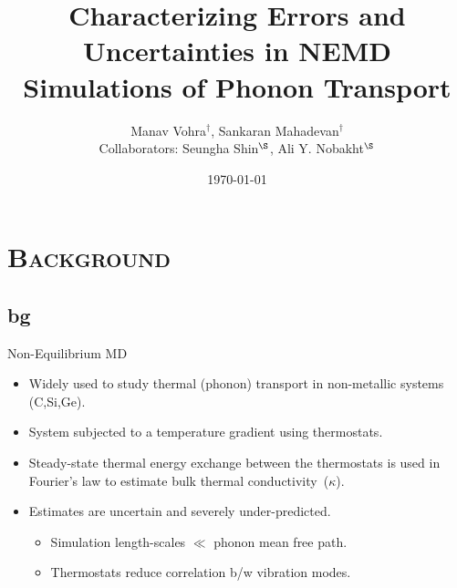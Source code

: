 \documentclass[xcolor={x11names,table},compress,svgnames,mathserif]{beamer}
\title[UQ: Nano-scale Phonon Heat Transfer]{\textbf{Characterizing Errors and Uncertainties in
NEMD Simulations of Phonon Transport}}
\author[M. Vohra and S. Mahadevan]{Manav Vohra$^{\dag}$, Sankaran Mahadevan$^{\dag}$ \\ \vspace{2mm}
\scriptsize{Collaborators: Seungha Shin$^{\S}$, Ali Y. Nobakht$^{\S}$}}
\institute{$^{\dag}$Vanderbilt University\\ \vspace{1mm}
$^{\S}$University of Tennessee, Knoxville}
\date{\today}
\renewcommand{\(}{\begin{columns}}
\renewcommand{\)}{\end{columns}}
\newcommand{\<}[1]{\begin{column}{#1}}
\renewcommand{\>}{\end{column}}
\newcommand*\myitem{%
  \item[\color{DeepSkyBlue4}\scalebox{0.6}{\ding{110}}]}
\begin{document}
{

\begin{frame}[noframenumbering]

\titlepage
\vspace{-21mm}
\centering



\end{frame}
}


\section{\scshape Background}
\subsection{bg}

\begin{frame}{Non-Equilibrium MD}

\begin{itemize}

\myitem Widely used to study thermal (phonon) transport in 
{\color{pigment}non-metallic} systems (C,Si,Ge).
\pause
\vspace{2mm}
\myitem System subjected to a temperature gradient using thermostats.
\pause
\vspace{2mm}
\myitem {\color{pigment}Steady-state} thermal energy exchange between
the thermostats is used in Fourier's law to estimate bulk thermal
conductivity~($\kappa$). 
\pause
\vspace{2mm}
\myitem Estimates are {\color{pigment}uncertain} and severely
{\color{pigment}under-predicted}.
\begin{itemize}
  \item Simulation length-scales $\ll$ phonon mean free path. \vspace{1mm}
  \item Thermostats reduce correlation b/w vibration modes.
\end{itemize}

\end{itemize}

\end{frame}
\end{document}
